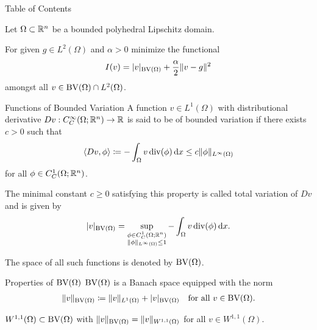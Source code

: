 \begin{frame}[noframenumbering]{Table of Contents}
\end{frame}

\begin{frame}

  \bigskip
  \pause

  Let $\Omega\subset\mathbb{R}^n$ be a bounded polyhedral Lipschitz domain.

  \medskip

  For given $g\in L^2(\Omega)$ and $\alpha>0$ minimize the functional 
  \begin{align*}
    I(v)=|v|_{\textup{BV}(\Omega)}+\frac{\alpha}{2}\Vert v-g\Vert^2
  \end{align*}
  amongst all $v\in \textup{BV}(\Omega)\cap L^2(\Omega)$.
\end{frame}

\begin{frame}{Functions of Bounded Variation}
  A function $v\in L^1(\Omega)$ with distributional derivative
  $Dv:C^{\infty}_C(\Omega;\mathbb{R}^n)\to\mathbb{R}$ is said to be of bounded variation if 
  there exists $c>0$ such that 
  \begin{align*}
    \langle Dv, \phi\rangle\coloneqq -\int_\Omega v\operatorname{div}(\phi)\,\mathrm{d}x\leq
    c\Vert\phi\Vert_{L^\infty(\Omega)}
  \end{align*}
  for all $\phi\in C^1_C(\Omega;\mathbb{R}^n)$.

  \pause  

  The minimal constant $c\geq 0$ satisfying this property is called 
  total variation of $Dv$ and is given by
  \begin{align*}
    |v|_{\textup{BV}(\Omega)} = \sup_{\substack{\phi\in C^1_C(\Omega;\mathbb{R}^n)\\
    \Vert\phi\Vert_{L^\infty(\Omega)}\leq 1}}-\int_\Omega v\operatorname{div} (\phi)\,\mathrm{d}x.
  \end{align*}

  \pause

  The space of all such functions is denoted by $\textup{BV}(\Omega)$.
\end{frame}

\begin{frame}{Properties of $\textup{BV}(\Omega)$}
  $\textup{BV}(\Omega)$ is a Banach space equipped with the norm
  \begin{align*}
    \Vert v \Vert_{\textup{BV}(\Omega)} \coloneqq \Vert v\Vert_{L^1(\Omega)} +
    |v|_{\textup{BV}(\Omega)}\quad\text{for all } v\in\textup{BV}(\Omega).
  \end{align*}
  
  \pause
  \medskip
  $W^{1,1}(\Omega)\subset\textup{BV}(\Omega)$ with $\Vert v\Vert_{\textup{BV}(\Omega)}=
  \Vert v\Vert_{W^{1,1}(\Omega)}$ for all $v\in W^{1,1}(\Omega)$.
\end{frame}

